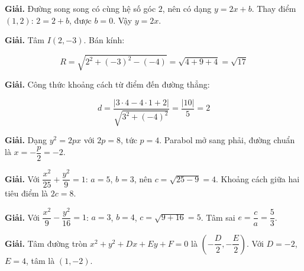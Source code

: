\documentclass[11pt, a4paper]{article}
\begin{document}
\vspace{0.3cm}
\begin{dapan}[12 — Đáp án D]

\textbf{Giải.} Đường song song có cùng hệ số góc $2$, nên có dạng $y = 2x + b$. Thay điểm $(1, 2)$: $2 = 2 + b$, được $b = 0$. Vậy $y = 2x$.


\end{dapan}
\vspace{0.3cm}
\begin{dapan}[13 — Đáp án B]

\textbf{Giải.} Tâm $I(2, -3)$. Bán kính:

$$R = \sqrt{2^2 + (-3)^2 - (-4)} = \sqrt{4 + 9 + 4} = \sqrt{17}$$


\end{dapan}
\vspace{0.3cm}
\begin{dapan}[14 — Đáp án D]

\textbf{Giải.} Công thức khoảng cách từ điểm đến đường thẳng:

$$d = \dfrac{\lvert 3 \cdot 4 - 4 \cdot 1 + 2 \rvert}{\sqrt{3^2 + (-4)^2}} = \dfrac{\lvert 10 \rvert}{5} = 2$$


\end{dapan}
\vspace{0.3cm}
\begin{dapan}[15 — Đáp án B]

\textbf{Giải.} Dạng $y^2 = 2px$ với $2p = 8$, tức $p = 4$. Parabol mở sang phải, đường chuẩn là $x = -\dfrac{p}{2} = -2$.


\end{dapan}
\vspace{0.3cm}
\begin{dapan}[16 — Đáp án C]

\textbf{Giải.} Với $\dfrac{x^2}{25} + \dfrac{y^2}{9} = 1$: $a = 5$, $b = 3$, nên $c = \sqrt{25 - 9} = 4$. Khoảng cách giữa hai tiêu điểm là $2c = 8$.


\end{dapan}
\vspace{0.3cm}
\begin{dapan}[17 — Đáp án C]

\textbf{Giải.} Với $\dfrac{x^2}{9} - \dfrac{y^2}{16} = 1$: $a = 3$, $b = 4$, $c = \sqrt{9 + 16} = 5$. Tâm sai $e = \dfrac{c}{a} = \dfrac{5}{3}$.


\end{dapan}
\vspace{0.3cm}
\begin{dapan}[18 — Đáp án D]

\textbf{Giải.} Tâm đường tròn $x^2 + y^2 + Dx + Ey + F = 0$ là $\left(-\dfrac{D}{2}, -\dfrac{E}{2}\right)$. Với $D = -2$, $E = 4$, tâm là $(1, -2)$.


\end{dapan}
\end{document}
